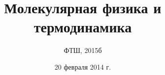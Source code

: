 \documentclass[12pt,a4paper]{report}
\begin{document}
 
\title{Молекулярная физика и термодинамика}
\author{ФТШ, 2015б}
\date{20 февраля 2014 г.}
\maketitle


\tableofcontents
 


 
\end{document}
